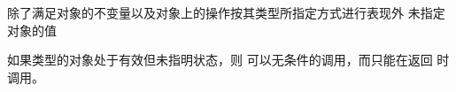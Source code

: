 除了满足对象的不变量以及对象上的操作按其类型所指定方式进行表现外
未指定对象的值

\begin{example}
  如果类型的对象处于有效但未指明状态，则
  可以无条件的调用，而只能在返回
  时调用。
\end{example}
